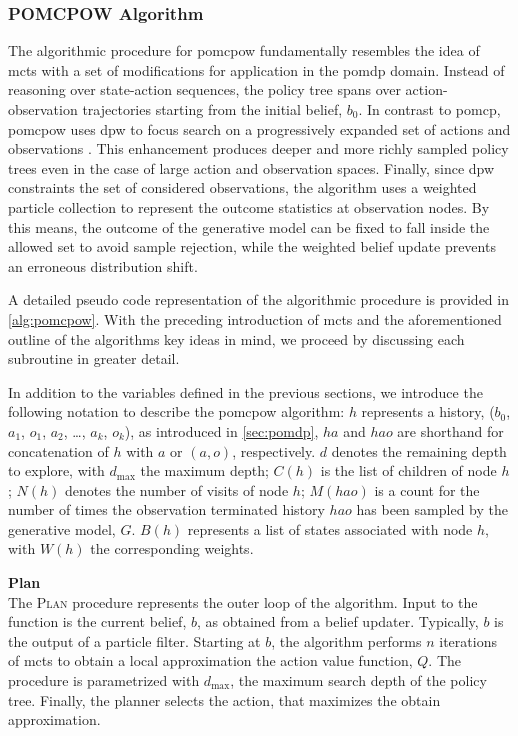 \subsubsection{POMCPOW Algorithm}

The algorithmic procedure for \ac{pomcpow} fundamentally resembles the idea of
\ac{mcts} with a set of modifications for application in the \ac{pomdp} domain.
Instead of reasoning over state-action sequences, the policy tree spans over
action-observation trajectories starting from the initial belief, $b_0$. In
contrast to \ac{pomcp}, \ac{pomcpow} uses \ac{dpw} to focus search on
a progressively expanded set of actions and observations \cite{silver2010pomcp,
sunberg2018online}. This enhancement produces deeper and more richly
sampled policy trees even in the case of large action and observation spaces.
Finally, since \ac{dpw} constraints the set of considered observations, the
algorithm uses a weighted particle collection to represent the outcome
statistics at observation nodes. By this means, the outcome of the generative
model can be fixed to fall inside the allowed set to avoid sample rejection,
while the weighted belief update prevents an erroneous distribution shift.

A detailed pseudo code representation of the algorithmic procedure is provided
in \cref{alg:pomcpow}. With the preceding introduction of \ac{mcts} and the
aforementioned outline of the algorithms key ideas in mind, we proceed by
discussing each subroutine in greater detail.

In addition to the variables defined in the previous sections, we introduce the
following notation to describe the \ac{pomcpow} algorithm: $h$ represents
a history, ($b_0$, $a_1$, $o_1$, $a_2$, \dots, $a_k$, $o_k$), as introduced in
\cref{sec:pomdp}, $ha$ and $hao$ are shorthand for concatenation of $h$ with
$a$ or $(a, o)$, respectively. $d$ denotes the remaining depth to explore, with
$d_\text{max}$ the maximum depth; $C(h)$ is the list of children of node $h$;
$N(h)$ denotes the number of visits of node $h$; $M(hao)$ is a count for the
number of times the observation terminated history $hao$ has been sampled by
the generative model, $G$. $B(h)$ represents a list of states associated with
node $h$, with $W(h)$ the corresponding weights.

\textbf{Plan}\\
The \textsc{Plan} procedure represents the outer loop of the algorithm. Input
to the function is the current belief, $b$, as obtained from a belief updater.
Typically, $b$ is the output of a particle filter. Starting at $b$, the
algorithm performs $n$ iterations of \ac{mcts} to obtain a local approximation
the action value function, $Q$. The procedure is parametrized with
$d_\text{max}$, the maximum search depth of the policy tree. Finally, the planner
selects the action, that maximizes the obtain \qfunction approximation.

